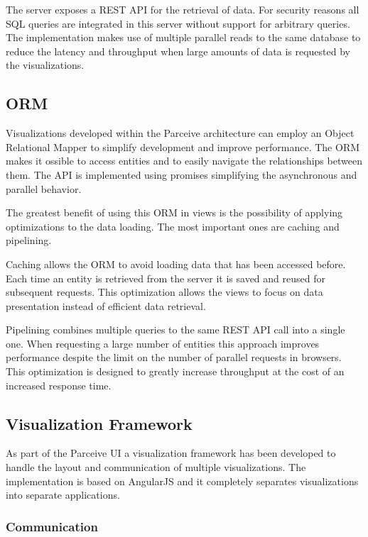The server exposes a REST \cite{rest} API for the retrieval of data. For security reasons all SQL queries are integrated in this server without support for arbitrary queries. The implementation makes use of multiple parallel reads to the same database to reduce the latency and throughput when large amounts of data is requested by the visualizations.

\subsection{ORM}

Visualizations developed within the Parceive architecture can employ an Object Relational Mapper to simplify development and improve performance. The ORM makes it ossible to access entities and to easily navigate the relationships between them. The API is implemented using promises \cite{promises} simplifying the asynchronous and parallel behavior.

The greatest benefit of using this ORM in views is the possibility of applying optimizations to the data loading. The most important ones are caching and pipelining.

Caching allows the ORM to avoid loading data that has been accessed before. Each time an entity is retrieved from the server it is saved and reused for subsequent requests. This optimization allows the views to focus on data presentation instead of efficient data retrieval.

Pipelining combines multiple queries to the same REST API call into a single one. When requesting a large number of entities this approach improves performance despite the limit on the number of parallel requests in browsers. This optimization is designed to greatly increase throughput at the cost of an increased response time.

\subsection{Visualization Framework}

As part of the Parceive UI a visualization framework has been developed to handle the layout and communication of multiple visualizations. The implementation is based on AngularJS and it completely separates visualizations into separate applications.

\subsubsection{Communication}

